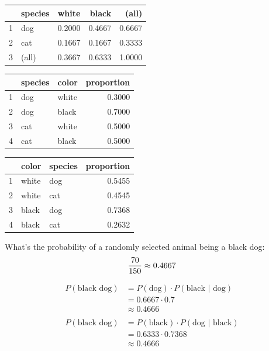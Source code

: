 \documentclass[landscape]{exam}
\begin{document}
  \begin{table}[H]
    \begin{tabular}{rlrrr}
      \toprule
        & species & white  & black  & (all) \\
      \midrule
      1 & dog     & 0.2000 & 0.4667 & 0.6667 \\
      2 & cat     & 0.1667 & 0.1667 & 0.3333 \\
      \midrule
      3 & (all)   & 0.3667 & 0.6333 & 1.0000 \\
      \bottomrule
    \end{tabular}
  \end{table}

  \begin{table}[ht]
    \begin{tabular}{rllr}
      \toprule
         & species & color & proportion \\
      \midrule
      1  & dog     & white & 0.3000 \\
      2  & dog     & black & 0.7000 \\
      \midrule
      3  & cat     & white & 0.5000 \\
      4  & cat     & black & 0.5000 \\
      \bottomrule
    \end{tabular}
  \end{table}

  \begin{table}[ht]
    \begin{tabular}{rllr}
      \toprule
         & color & species & proportion \\
      \midrule
      1  & white & dog     & 0.5455 \\
      2  & white & cat     & 0.4545 \\
      \midrule
      3  & black & dog     & 0.7368 \\
      4  & black & cat     & 0.2632 \\
      \bottomrule
    \end{tabular}
  \end{table}

  What's the probability of a randomly selected animal being a black dog:
  \[
    \frac{70}{150} \approx 0.4667 \\
  \]

  \begin{align*}
    P(\text{black dog}) & = P(\text{dog}) \cdot P(\text{black } | \text{ dog}) \\
                        & = 0.6667 \cdot 0.7 \\
                        & \approx 0.4666 \\
                        \\
    P(\text{black dog}) & = P(\text{black}) \cdot P(\text{dog } | \text{ black}) \\
                        & = 0.6333 \cdot 0.7368 \\
                        & \approx 0.4666 \\
  \end{align*}
\end{document}
